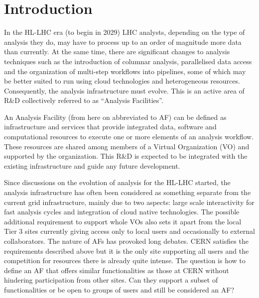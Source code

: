 \section{Introduction}\label{introduction}


In the HL-LHC era (to begin in 2029) LHC analysts, depending on the type of analysis they do, may have to process up to an order of magnitude more data than currently. At the same time, there are significant changes to analysis techniques such as the introduction of columnar analysis, parallelised data access and the organization of multi-step workflows into pipelines, some of which may be better suited to run using cloud technologies and heterogeneous resources. Consequently, the analysis infrastructure must evolve. This is an active area of R\&D collectively referred to as “Analysis Facilities”. 

An Analysis Facility (from here on abbreviated to AF) can be defined as infrastructure and services that provide integrated data, software and computational resources to execute one or more elements of an analysis workflow. These resources are shared among members of a Virtual Organization (VO) and supported by the organization. This R\&D is expected to be integrated with the existing infrastructure and guide any future development.   


Since discussions on the evolution of analysis for the HL-LHC started, the analysis infrastructure has often been considered as something separate from the current grid infrastructure, mainly due to two aspects: large scale interactivity for fast analysis cycles and integration of cloud native technologies. The possible additional requirement to support whole VOs also sets it apart from the local Tier 3 sites currently giving access only to local users and occasionally to external collaborators. The nature of AFs has provoked long debates. CERN satisfies the requirements described above but it is the only site supporting all users and the competition for resources there is already quite intense. The question is how to define an AF that offers similar functionalities as those at CERN without hindering participation from other sites. Can they support a subset of functionalities or be open to groups of users and still be considered an AF?

